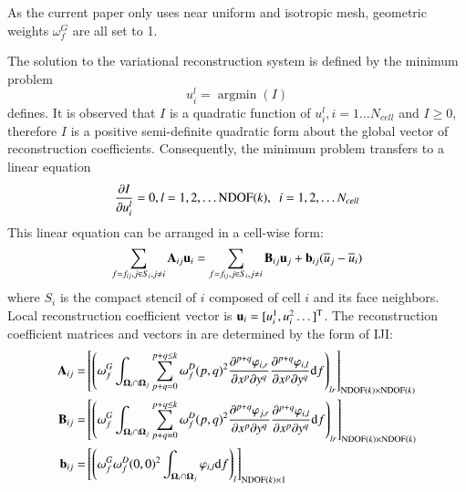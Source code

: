 \documentclass[preprint,12pt]{elsarticle}
\begin{document}
As the current paper only uses near uniform and isotropic mesh,
geometric weights
$\omega^G_f$ are all set to 1.

The solution to the variational reconstruction system is defined by the minimum problem
\begin{equation}
    u_i^l = \mathop{\arg \min}(I)
\end{equation}
defines.
It is observed that $I$ is a quadratic function of $u_i^l, i = 1...N_{cell}$ and
$I\geq 0$,
therefore $I$ is a positive semi-definite quadratic form about the global vector of reconstruction
coefficients. Consequently, the minimum problem transfers to a linear equation
\begin{equation}
    \partialderivative{I}{u_i^l} = 0, l=1,2,\dots \mathrm{NDOF}(k),\ \ i=1,2,\dots N_{cell}
\end{equation}
This linear equation can be arranged in a cell-wise form:
\begin{equation}
    \label{eq:vrBlockEq}
    \sum_{f=f_{ij},j\in S_i, j\neq i}{ \mathbf{A}_{ij} \mathbf{u}_i}
    =
    \sum_{f=f_{ij},j\in S_i, j\neq i}{ \mathbf{B}_{ij} \mathbf{u}_j + \mathbf{b}_{ij} (\overline{u}_j - \overline{u}_i)}
\end{equation}
where $S_i$ is the compact stencil of $i$ composed of cell $i$ and its face neighbors.
Local reconstruction coefficient vector is $\mathbf{u}_i = [u_i^1,u_i^2\dots]^\mathrm{T}$.
The reconstruction coefficient matrices and vectors in 
are determined by the form of IJI:
\begin{equation}
    \label{eq:vrCoeffs}
    \begin{aligned}
        \mathbf{A}_{ij} = &
        \left[
            \left({
                \omega_f^G\int_{\OO_i \cap \OO_j}{
                    \sum_{p+q=0}^{p + q\leq k}
                    \omega_f^D(p,q)^2
                    \partialderivative{^{p+q}\varphi_{i,r}}{x^p\partial y^q}
                    \partialderivative{^{p+q}\varphi_{i,l}}{x^p\partial y^q}
                    \dd f}
            }\right)_{lr}
        \right]_{\mathrm{NDOF}(k) \times \mathrm{NDOF}(k)} \\
        \mathbf{B}_{ij}=  &
        \left[
            \left({
                \omega_f^G\int_{\OO_i \cap \OO_j}{
                    \sum_{p+q=0}^{p + q\leq k}
                    \omega_f^D(p,q)^2
                    \partialderivative{^{p+q}\varphi_{j,r}}{x^p\partial y^q}
                    \partialderivative{^{p+q}\varphi_{i,l}}{x^p\partial y^q}
                    \dd f}
            }\right)_{lr}
        \right]_{\mathrm{NDOF}(k) \times \mathrm{NDOF}(k)} \\
        \mathbf{b}_{ij}=  &
        \left[
            \left({
                    \omega_f^G\omega_f^D(0,0)^2
                    \int_{\OO_i \cap \OO_j}{
                        \varphi_{i,l}
                        \dd f}
                }\right)_{l}
        \right]_{\mathrm{NDOF}(k) \times 1}                \\
    \end{aligned}
\end{equation}
\end{document}
